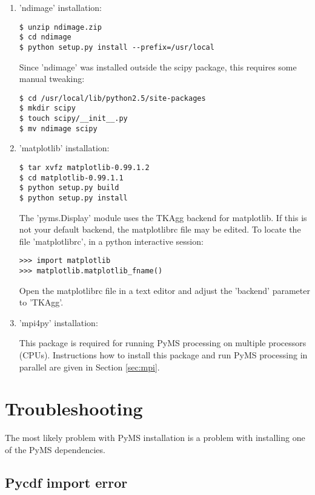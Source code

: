 \begin{enumerate}
\item 'ndimage' installation:

\begin{verbatim}
$ unzip ndimage.zip
$ cd ndimage
$ python setup.py install --prefix=/usr/local
\end{verbatim}

\noindent
Since 'ndimage' was installed outside the scipy package, this requires
some manual tweaking:

\begin{verbatim}
$ cd /usr/local/lib/python2.5/site-packages
$ mkdir scipy
$ touch scipy/__init__.py
$ mv ndimage scipy
\end{verbatim}

\item 'matplotlib' installation:

\begin{verbatim}
$ tar xvfz matplotlib-0.99.1.2
$ cd matplotlib-0.99.1.1
$ python setup.py build
$ python setup.py install
\end{verbatim}

\noindent
The 'pyms.Display' module uses the TKAgg backend for matplotlib. If
this is not your default backend, the matplotlibrc file may be edited.
To locate the file 'matplotlibrc', in a python interactive session:

\begin{verbatim}
>>> import matplotlib
>>> matplotlib.matplotlib_fname()
\end{verbatim}

\noindent
Open the matplotlibrc file in a text editor and adjust the 'backend'
parameter to 'TKAgg'.

\item 'mpi4py' installation:

This package is required for running PyMS processing on multiple processors
(CPUs). Instructions how to install this package and run PyMS processing
in parallel are given in Section \ref{sec:mpi}. 

\end{enumerate}

\section{Troubleshooting}

The most likely problem with PyMS installation is a problem with
installing one of the PyMS dependencies.

\subsection{Pycdf import error}

